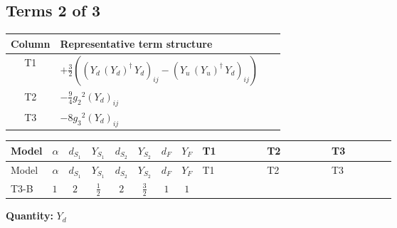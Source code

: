 \documentclass[8pt]{article}
\begin{document}
\begin{landscape}
\subsection*{Terms 2 of 3}
\begin{center}
\begin{tabular}{@{}c >{\raggedright\arraybackslash}p{0.82\linewidth}@{}}
\toprule
Column & Representative term structure \\
\midrule
T1 & \(\displaystyle +\frac{3}{2} (\left({Y_d}\,\left({Y_d}\right)^{\dagger}\,{Y_d}\right)_{ij}-\left({Y_u}\,\left({Y_u}\right)^{\dagger}\,{Y_d}\right)_{ij})\) \\
\midrule
T2 & \(\displaystyle -\frac{9}{4} {g_2}^2 \left({Y_d}\right)_{ij}\) \\
\midrule
T3 & \(\displaystyle -8 {g_3}^2 \left({Y_d}\right)_{ij}\) \\
\midrule
\bottomrule
\end{tabular}
\end{center}
\smallskip
\tiny
\begin{longtable}{@{}llcccccc >{\raggedright\arraybackslash}p{0.21\linewidth} >{\raggedright\arraybackslash}p{0.21\linewidth} >{\raggedright\arraybackslash}p{0.21\linewidth}@{}}
\toprule
Model & $\alpha$ & $d_{S_1}$ & $Y_{S_1}$ & $d_{S_2}$ & $Y_{S_2}$ & $d_F$ & $Y_F$ & T1 & T2 & T3 \\
\midrule
\endfirsthead
\toprule
Model & $\alpha$ & $d_{S_1}$ & $Y_{S_1}$ & $d_{S_2}$ & $Y_{S_2}$ & $d_F$ & $Y_F$ & T1 & T2 & T3 \\
\midrule
\endhead
T3-B & $1$ & $2$ & $\frac{1}{2}$ & $2$ & $\frac{3}{2}$ & $1$ & $1$ & \scriptsize\adjustbox{max width=\linewidth}{$\begin{gathered} +\frac{3}{2} (\left({Y_d}\,\left({Y_d}\right)^{\dagger}\,{Y_d}\right)_{ij}-\left({Y_u}\,\left({Y_u}\right)^{\dagger}\,{Y_d}\right)_{ij})\end{gathered}$} & \scriptsize\adjustbox{max width=\linewidth}{$\begin{gathered} -\frac{9}{4} {g_2}^2 \left({Y_d}\right)_{ij}\end{gathered}$} & \scriptsize\adjustbox{max width=\linewidth}{$\begin{gathered} -8 {g_3}^2 \left({Y_d}\right)_{ij}\end{gathered}$} \\
\midrule
\bottomrule
\end{longtable}
\clearpage
\noindent\textbf{Quantity: }$Y_d$\par\smallskip

\end{landscape}
\end{document}
